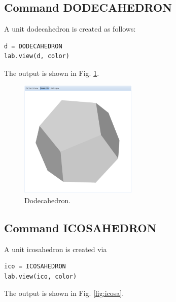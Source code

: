 \documentclass{article}
\begin{document}
\subsection{Command DODECAHEDRON}

A unit dodecahedron is created as follows:

\begin{verbatim}
d = DODECAHEDRON
lab.view(d, color)
\end{verbatim}
The output is shown in Fig. \ref{fig:dodeca}.

\newpage

\begin{figure}[!ht]
\begin{center}
\includegraphics[width=0.5\textwidth]{img/dodeca.png}
\end{center}
\vspace{-2mm}
\caption{Dodecahedron.}
\label{fig:dodeca}
\end{figure}

\subsection{Command ICOSAHEDRON}

A unit icosahedron is created via

\begin{verbatim}
ico = ICOSAHEDRON
lab.view(ico, color)
\end{verbatim}
The output is shown in Fig. \ref{fig:icosa}.

\newpage
\end{document}

